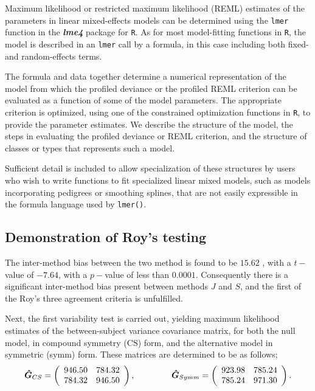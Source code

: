 Maximum likelihood or restricted maximum likelihood (REML) estimates of the parameters in linear mixed-effects models can be determined using the \texttt{lmer} function in the \textbf{\textit{lme4}} package for \texttt{R}. As for most model-fitting functions in \texttt{R}, the model is described in an \texttt{lmer} call by a formula, in this case including both fixed- and random-effects terms. 

The formula and data together determine a numerical representation of the model from which the profiled deviance or the profiled REML criterion can be evaluated as a function of some of the model parameters. The appropriate criterion is optimized, using one of the constrained optimization functions in \texttt{R}, to provide the parameter estimates. We describe the structure of the model, the steps in evaluating the profiled deviance or REML criterion, and the structure of classes or types that represents such a model. 

Sufficient detail is included to allow specialization of these structures by users who wish to write functions to fit specialized linear mixed models, such as models incorporating pedigrees or smoothing splines, that are not easily expressible in the formula language used by \texttt{lmer()}.



\subsection{Demonstration of Roy's testing}


The inter-method bias between the two method is found to be $15.62$ , with a $t-$value of $-7.64$, with a $p-$value of less than $0.0001$. Consequently there is a significant inter-method bias present between methods $J$ and $S$, and the first of the Roy's three agreement criteria is unfulfilled.

Next, the first variability test is carried out, yielding maximum likelihood estimates of the between-subject variance covariance matrix, for both the null model, in compound symmetry (CS) form, and the alternative model in symmetric (symm) form. These matrices are determined to be as follows;
\[
\boldsymbol{\hat{G}}_{CS} = \left( \begin{array}{cc}
946.50 & 784.32  \\
784.32 & 946.50  \\
\end{array}\right),
\hspace{1.5cm}
\boldsymbol{\hat{G}}_{Symm} = \left( \begin{array}{cc}
923.98 & 785.24  \\
785.24 & 971.30  \\
\end{array}\right).
\]

